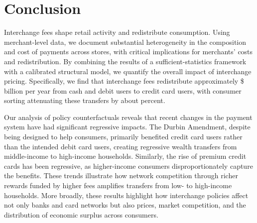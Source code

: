 \documentclass[main.tex]{subfiles}
\begin{document}
\section{Conclusion\label{sec:conclusion}}

Interchange fees shape retail activity and redistribute consumption.
Using merchant-level data, we document substantial heterogeneity in the composition and cost of payments across stores, with critical implications for merchants' costs and redistribution.
By combining the results of a sufficient-statistics framework with a calibrated structural model, we quantify the overall impact of interchange pricing.
Specifically, we find that interchange fees redistribute approximately \$ billion per year from cash and debit users to credit card users, with consumer sorting attenuating these transfers by about  percent.

Our analysis of policy counterfactuals reveals that recent changes in the payment system have had significant regressive impacts.
The Durbin Amendment, despite being designed to help consumers, primarily benefited credit card users rather than the intended debit card users, creating regressive wealth transfers from middle-income to high-income households.
Similarly, the rise of premium credit cards has been regressive, as higher-income consumers disproportionately capture the benefits.
These trends illustrate how network competition through richer rewards funded by higher fees amplifies transfers from low- to high-income households.
More broadly, these results highlight how interchange policies affect not only banks and card networks but also prices, market competition, and the distribution of economic surplus across consumers.
\end{document}
